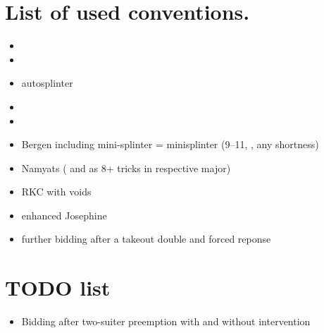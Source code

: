\documentclass[12pt,a4paper,twoside]{article}
\begin{document}
  \section{List of used conventions.}
  \begin{itemize}
    \item 
    \item 
    \item autosplinter
    \item 
    \item {}
    \item Bergen including mini-splinter \newline
       = minisplinter (9--11, , any shortness)
    \item Namyats ( and  as 8+ tricks in respective major)
    \item RKC with voids
    \item enhanced Josephine 
    \item further bidding after a takeout double and forced reponse
  \end{itemize}

  \section{TODO list}
  \begin{itemize}
    \item Bidding after two-suiter preemption with and without intervention
  \end{itemize}
\end{document}
